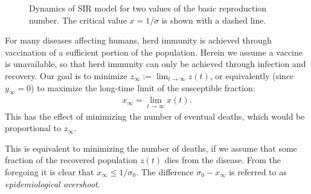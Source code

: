 \documentclass[english,12pt]{article}
\newcommand{\Rnot}{\sigma_0}
\newcommand{\Sinf}{x_\infty}
\begin{document}
\begin{figure}
    \centering
    \caption{Dynamics of SIR model for two values of the basic reproduction number.
            The critical value $x=1/\sigma$ is shown with a dashed line.\label{fig:dynamics}}
\end{figure}

For many diseases affecting humans, herd immunity is achieved
through vaccination of a sufficient portion of the population.  Herein
we assume a vaccine is unavailable, so that herd immunity can only be achieved
through infection and recovery.
Our goal is to minimize $z_\infty := \lim_{t \to \infty} z(t)$, or equivalently
(since $y_\infty=0$)
to maximize the long-time limit of the susceptible fraction:
\begin{align}
    \Sinf = \lim_{t\to\infty} x(t).
\end{align}
This has the effect of minimizing
the number of eventual deaths, which would be proportional to $z_\infty$.

This is equivalent to minimizing the number of deaths, if we assume that
some fraction of the recovered population $z(t)$ dies from the disease.
From the foregoing it is clear that $\Sinf \le 1/\Rnot$.  The difference
$\Rnot-\Sinf$ is referred to as {\em epidemiological overshoot}.
\end{document}

